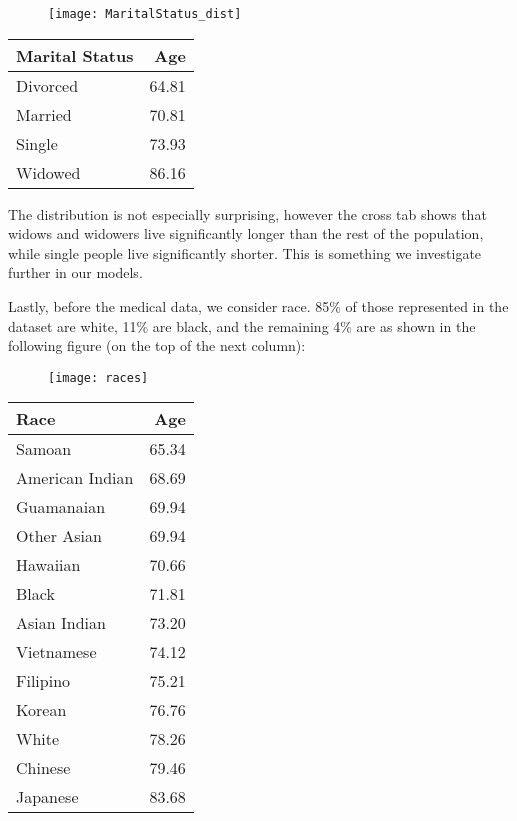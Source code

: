 \documentclass[letterpaper, 10 pt, conference]{ieeeconf}  %
\begin{document}
\begin{figure}[ht]
\label{Single Distribution}
\begin{center}
\texttt{[image: MaritalStatus\_dist]}
\end{center}
\end{figure}
\begin{table}[ht]
\begin{center}
\begin{tabular}{lr}
\toprule
Marital Status &    Age \\
\midrule
      Divorced &  64.81 \\
       Married &  70.81 \\
        Single &  73.93 \\
       Widowed &  86.16 \\
\bottomrule
\end{tabular}
\end{center}
\end{table}

The distribution is not especially surprising, however the cross tab shows that widows and widowers live significantly longer than the rest of the population, while single people live significantly shorter. This is something we investigate further in our models.

Lastly, before the medical data, we consider race. 85\% of those represented in the dataset are white, 11\% are black, and the remaining 4\% are as shown in the following figure (on the top of the next column):
\begin{figure}[ht]
\label{Race Distribution}
\begin{center}
\texttt{[image: races]}
\end{center}
\end{figure}


\begin{table}[ht]
\begin{center}
\begin{tabular}{lr}
\toprule
            Race &    Age \\
\midrule
          Samoan &  65.34 \\
 American Indian &  68.69 \\
      Guamanaian &  69.94 \\
     Other Asian &  69.94 \\
        Hawaiian &  70.66 \\
           Black &  71.81 \\
    Asian Indian &  73.20 \\
      Vietnamese &  74.12 \\
        Filipino &  75.21 \\
          Korean &  76.76 \\
           White &  78.26 \\
         Chinese &  79.46 \\
        Japanese &  83.68 \\
\bottomrule
\end{tabular}
\end{center}
\end{table}
\end{document}
